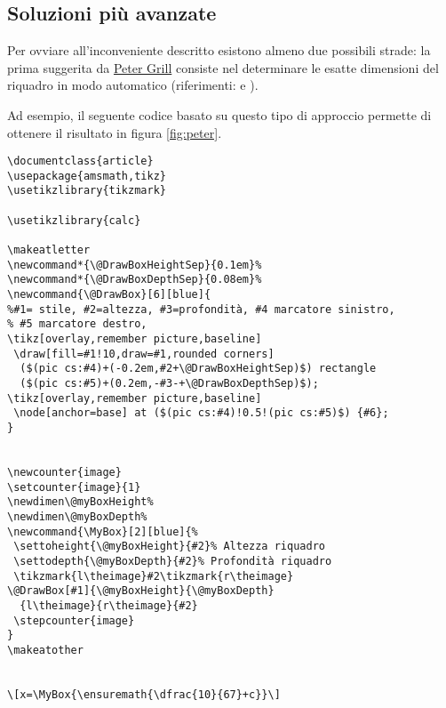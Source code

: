 \subsection{Soluzioni più avanzate}

Per ovviare all'inconveniente descritto esistono almeno due possibili strade: la prima suggerita da \href{http://tex.stackexchange.com/users/4301/peter-grill}{Peter Grill} consiste nel determinare le esatte dimensioni del riquadro in modo automatico (riferimenti:  e ).

Ad esempio, il seguente codice basato su questo tipo di approccio permette di ottenere il risultato in figura \ref{fig:peter}.
\begin{lstlisting}[frame=lines]
\documentclass{article}
\usepackage{amsmath,tikz}
\usetikzlibrary{tikzmark}

\usetikzlibrary{calc}

\makeatletter
\newcommand*{\@DrawBoxHeightSep}{0.1em}%
\newcommand*{\@DrawBoxDepthSep}{0.08em}%
\newcommand{\@DrawBox}[6][blue]{
%#1= stile, #2=altezza, #3=profondità, #4 marcatore sinistro,
% #5 marcatore destro,
\tikz[overlay,remember picture,baseline]
 \draw[fill=#1!10,draw=#1,rounded corners]
  ($(pic cs:#4)+(-0.2em,#2+\@DrawBoxHeightSep)$) rectangle
  ($(pic cs:#5)+(0.2em,-#3-+\@DrawBoxDepthSep)$);
\tikz[overlay,remember picture,baseline]
 \node[anchor=base] at ($(pic cs:#4)!0.5!(pic cs:#5)$) {#6};
}


\newcounter{image}
\setcounter{image}{1}
\newdimen\@myBoxHeight%
\newdimen\@myBoxDepth%
\newcommand{\MyBox}[2][blue]{%
 \settoheight{\@myBoxHeight}{#2}% Altezza riquadro
 \settodepth{\@myBoxDepth}{#2}% Profondità riquadro
 \tikzmark{l\theimage}#2\tikzmark{r\theimage}
\@DrawBox[#1]{\@myBoxHeight}{\@myBoxDepth}
  {l\theimage}{r\theimage}{#2}
 \stepcounter{image}
}
\makeatother


\[x=\MyBox{\ensuremath{\dfrac{10}{67}+c}}\]

\end{lstlisting}


